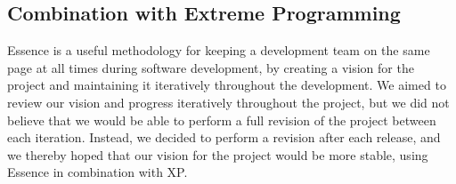 
\subsection{Combination with Extreme Programming}
\label{sub:combination_with_extreme_programming}
Essence is a useful methodology for keeping a development team on the same page at all times during software development, by creating a vision for the project and maintaining it iteratively throughout the development. We aimed to review our vision and progress iteratively throughout the project, but we did not believe that we would be able to perform a full revision of the project between each iteration. Instead, we decided to perform a revision after each release, and we thereby hoped that our vision for the project would be more stable, using Essence in combination with XP.